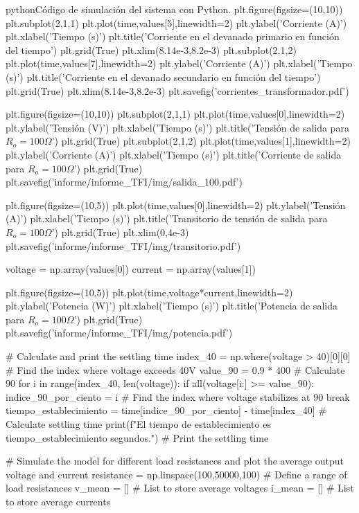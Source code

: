 \begin{appendixd}
\begin{sourcecode}{python}{Código de simulación del sistema con Python.}
	plt.figure(figsize=(10,10))
	plt.subplot(2,1,1)
	plt.plot(time,values[5],linewidth=2)
	plt.ylabel('Corriente (A)')
	plt.xlabel('Tiempo (s)')
	plt.title('Corriente en el devanado primario en función del tiempo')
	plt.grid(True)
	plt.xlim(8.14e-3,8.2e-3)
	plt.subplot(2,1,2)
	plt.plot(time,values[7],linewidth=2)
	plt.ylabel('Corriente (A)')
	plt.xlabel('Tiempo (s)')
	plt.title('Corriente en el devanado secundario en función del tiempo')
	plt.grid(True)
	plt.xlim(8.14e-3,8.2e-3)
	plt.savefig('corrientes_transformador.pdf')
	
	plt.figure(figsize=(10,10))
	plt.subplot(2,1,1)
	plt.plot(time,values[0],linewidth=2)
	plt.ylabel('Tensión (V)')
	plt.xlabel('Tiempo (s)')
	plt.title('Tensión de salida para $R_o=100\Omega$')
	plt.grid(True)
	plt.subplot(2,1,2)
	plt.plot(time,values[1],linewidth=2)
	plt.ylabel('Corriente (A)')
	plt.xlabel('Tiempo (s)')
	plt.title('Corriente de salida para $R_o=100\Omega$')
	plt.grid(True)
	plt.savefig('informe/informe_TFI/img/salida_100.pdf')
	
	plt.figure(figsize=(10,5))
	plt.plot(time,values[0],linewidth=2)
	plt.ylabel('Tensión (A)')
	plt.xlabel('Tiempo (s)')
	plt.title('Transitorio de tensión de salida para $R_o=100\Omega$')
	plt.grid(True)
	plt.xlim(0,4e-3)
	plt.savefig('informe/informe_TFI/img/transitorio.pdf')
	
	voltage = np.array(values[0])
	current = np.array(values[1])
	
	plt.figure(figsize=(10,5))
	plt.plot(time,voltage*current,linewidth=2)
	plt.ylabel('Potencia (W)')
	plt.xlabel('Tiempo (s)')
	plt.title('Potencia de salida para $R_o=100\Omega$')
	plt.grid(True)
	plt.savefig('informe/informe_TFI/img/potencia.pdf')
	
	# Calculate and print the settling time
	index_40 = np.where(voltage > 40)[0][0]  # Find the index where voltage exceeds 40V
	value_90 = 0.9 * 400  # Calculate 90%
	for i in range(index_40, len(voltage)):
	if all(voltage[i:] >= value_90):
	indice_90_por_ciento = i  # Find the index where voltage stabilizes at 90%
	break
	tiempo_establecimiento = time[indice_90_por_ciento] - time[index_40]  # Calculate settling time
	print(f"El tiempo de establecimiento es {tiempo_establecimiento} segundos.")  # Print the settling time
	
	# Simulate the model for different load resistances and plot the average output voltage and current
	resistance = np.linspace(100,50000,100)  # Define a range of load resistances
	v_mean = []  # List to store average voltages
	i_mean = []  # List to store average currents
	

\end{sourcecode}
\end{appendixd}
